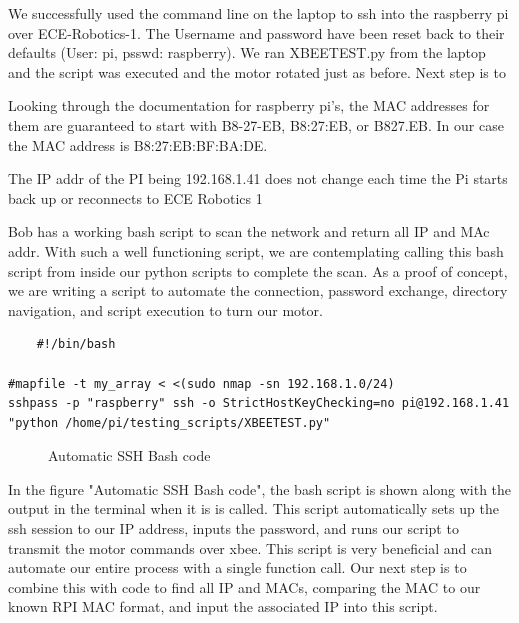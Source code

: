 \documentclass[fontsize=11pt, %
                             paper=letter, %
                             twoside, %
                             captions=tableheading,
                             index=totoc,
                             hyperref]{labbook}
\begin{document}
We successfully used the command line on the laptop to ssh into the raspberry pi over ECE-Robotics-1. The Username and password have been reset back to their defaults (User: pi, psswd: raspberry). We ran XBEETEST.py from the laptop and the script was executed and the motor rotated just as before. Next step is to 

Looking through the documentation for raspberry pi's, the MAC addresses for them are guaranteed to start with B8-27-EB, B8:27:EB, or B827.EB. In our case the MAC address is B8:27:EB:BF:BA:DE.

The IP addr of the PI being 192.168.1.41 does not change each time the Pi starts back up or reconnects to ECE Robotics 1

Bob has a working bash script to scan the network and return all IP and MAc addr. With such a well functioning script, we are contemplating calling this bash script from inside our python scripts to complete the scan. As a proof of concept, we are writing a script to automate the connection, password exchange, directory navigation, and script execution to turn our motor. 
\begin{verbatim}
    #!/bin/bash

#mapfile -t my_array < <(sudo nmap -sn 192.168.1.0/24)
sshpass -p "raspberry" ssh -o StrictHostKeyChecking=no pi@192.168.1.41 "python /home/pi/testing_scripts/XBEETEST.py" 

\end{verbatim}
    
\begin{figure}
  
  \caption{Automatic SSH Bash code}
  \label{fig:BashSSH}
\end{figure}

In the figure "Automatic SSH Bash code", the bash script is shown along with the output in the terminal when it is is called. This script automatically sets up the ssh session to our IP address, inputs the password, and runs our script to transmit the motor commands over xbee. This script is very beneficial and can automate our entire process with a single function call. Our next step is to combine this with code to find all IP and MACs, comparing the MAC to our known RPI MAC format, and input the associated IP into this script. 
\end{document}
